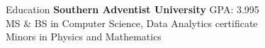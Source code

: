 \begin{rSection}{Education}
  {\bf Southern Adventist University} \hfill GPA: {3.995}\\%
  MS \& BS in Computer Science, Data Analytics certificate \hfill {}\\
  Minors in Physics and Mathematics
\end{rSection}
